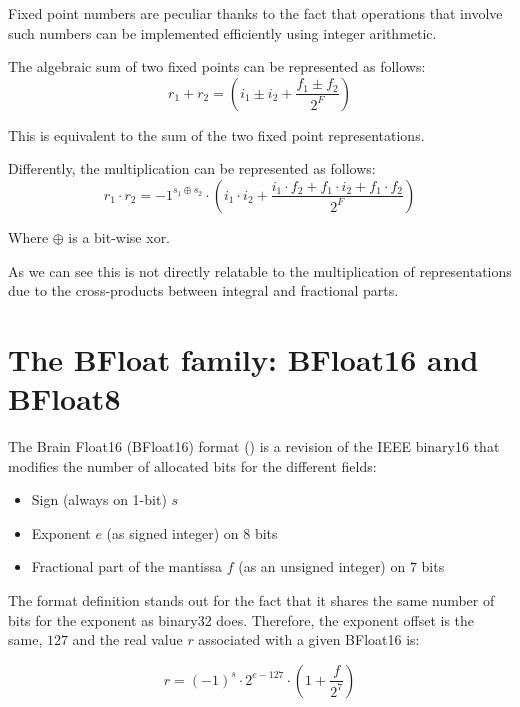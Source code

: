 Fixed point numbers are peculiar thanks to the fact that operations that involve such numbers can be implemented efficiently using integer arithmetic.

The algebraic sum of two fixed points can be represented as follows:
\begin{equation}\label{eqn:fixedSum}
    r_1 + r_2 = \left(i_1 \pm i_2 + \frac{f_1 \pm f_2}{2^{F}}\right)
\end{equation}

This is equivalent to the sum of the two fixed point representations.

Differently, the multiplication can be represented as follows:
\begin{equation}\label{eqn:fixedMul}
    r_1 \cdot r_2 = -1^{s_1 \oplus s_2}\cdot \left(i_1 \cdot i_2 + \frac{i_1 \cdot f_2 + f_1\cdot i_2 + f_1 \cdot f_2}{2^F}\right) 
\end{equation}

Where $\oplus$ is a bit-wise xor.

As we can see this is not directly relatable to the multiplication of representations due to the cross-products between integral and fractional parts.

\section{The BFloat family: BFloat16 and BFloat8}

The Brain Float16 (BFloat16) format (\cite{burgess2019bfloat}) is a revision of the IEEE binary16 that modifies the number of allocated bits for the different fields:

\begin{itemize}
    \item Sign (always on 1-bit) $s$
    \item Exponent $e$ (as signed integer) on $8$ bits
    \item Fractional part of the mantissa $f$ (as an unsigned integer) on $7$ bits
\end{itemize}

The format definition stands out for the fact that it shares the same number of bits for the exponent as binary32 does. Therefore, the exponent offset is the same, $127$ and the real value $r$ associated with a given BFloat16 is:

\begin{equation}\label{eqn:bfloat162real}
    r = (-1)^s \cdot 2^{e-127} \cdot \left(1 + \frac{f}{2^7} \right)
\end{equation}

